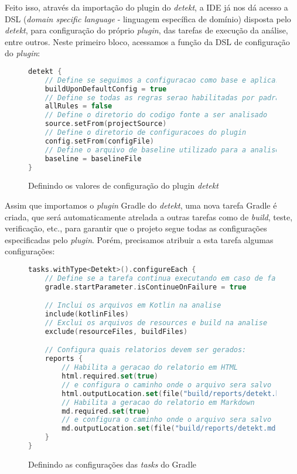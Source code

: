 Feito isso, através da importação do plugin do \textit{detekt}, a IDE já nos dá acesso a DSL (\textit{domain specific language} - linguagem específica de domínio) disposta pelo \textit{detekt}, para configuração do próprio \textit{plugin}, das tarefas de execução da análise, entre outros. Neste primeiro bloco, acessamos a função da DSL de configuração do \textit{plugin}:

\begin{figure}[H]
    \begin{lstlisting}[language=Kotlin,numbers = none]
detekt {
    // Define se seguimos a configuracao como base e aplicar apenas as que definirmos explicitamente
    buildUponDefaultConfig = true
    // Define se todas as regras serao habilitadas por padrao
    allRules = false
    // Define o diretorio do codigo fonte a ser analisado
    source.setFrom(projectSource)
    // Define o diretorio de configuracoes do plugin
    config.setFrom(configFile)
    // Define o arquivo de baseline utilizado para a analise de Code Smell
    baseline = baselineFile
}
    \end{lstlisting}
    \caption{Definindo os valores de configuração do plugin \textit{detekt}}
\end{figure}

Assim que importamos o \textit{plugin} Gradle do \textit{detekt}, uma nova tarefa Gradle é criada, que será automaticamente atrelada a outras tarefas como de \textit{build}, teste, verificação, etc., para garantir que o projeto segue todas as configurações especificadas pelo \textit{plugin}. Porém, precisamos atribuir a esta tarefa algumas configurações:

\begin{figure}[H]
    \begin{lstlisting}[language=Kotlin,numbers = none]
tasks.withType<Detekt>().configureEach {
    // Define se a tarefa continua executando em caso de falha (mantendo seu resultado)
    gradle.startParameter.isContinueOnFailure = true

    // Inclui os arquivos em Kotlin na analise
    include(kotlinFiles)
    // Exclui os arquivos de resources e build na analise
    exclude(resourceFiles, buildFiles)

    // Configura quais relatorios devem ser gerados:
    reports {
        // Habilita a geracao do relatorio em HTML
        html.required.set(true)
        // e configura o caminho onde o arquivo sera salvo
        html.outputLocation.set(file("build/reports/detekt.html"))
        // Habilita a geracao do relatorio em Markdown
        md.required.set(true)
        // e configura o caminho onde o arquivo sera salvo
        md.outputLocation.set(file("build/reports/detekt.md"))
    }
}
    \end{lstlisting}
    \caption{Definindo as configurações das \textit{tasks} do Gradle}
    \label{fig:set_detekt_tasks_config}
\end{figure}

